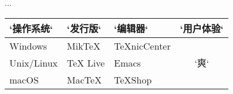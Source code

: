 \usepackage{multirow}
...
\begin{table}[htbp]
\centering
\begin{tabular}{lllc}
  \toprule
  `操作系统`    & `发行版`    & `编辑器`        & `用户体验`\\
  \midrule
  Windows    & MikTeX   & TeXnicCenter & 
  \multirow{3}{*}{\centering `爽`} \\
  Unix/Linux & TeX Live & Emacs \\
  macOS      & MacTeX   & TeXShop \\
  \bottomrule
\end{tabular}
\end{table}
